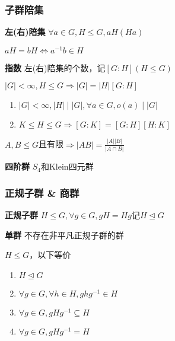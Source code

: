\documentclass[a4paper,10pt]{ctexart}
\newcommand*{\impl}{\Rightarrow}
\renewcommand*{\iff}{\Leftrightarrow}
\renewcommand*{\leq}{\leqslant}
\newcommand*{\nmsubgroupeq}{\trianglelefteq}
\begin{document}
\begin{multicols}{3}
    \subsubsection{子群陪集}

    \textbf{左(右)陪集} $\forall a \!\in\! G, H \!\leq\! G, aH(Ha)$

    \begin{theorem}[陪集相等判则]
        $aH = bH \iff a^{-1}b \in H$
    \end{theorem}

    \textbf{指数} 左(右)陪集的个数，记$[G\!:\!H](H \!\leq\! G)$

    \begin{theorem}[Lagrange定理]
        $|G| \! < \! \infty, H \!\leq\! G \!\impl\! |G| \! = \! |H|[G:H]$
    \end{theorem}

    \begin{theorem}[指数性质]
        \hfil

        \begin{enumerate}
            \item $|G| < \infty, |H| \mid |G|, \forall a \in G, o(a) \mid |G|$
            \item $K \!\leq\! H \!\leq\! G \!\impl\! [G\!:\!K] \! = \! [G\!:\!H][H\!:\!K]$
        \end{enumerate}
    \end{theorem}

    \begin{theorem}[子群阶]
        $A, B \!\leq\! G$且有限$\impl |AB| = \frac{ |A| |B| }{ |A \cap B| }$
    \end{theorem}

    \textbf{四阶群} $S_4$和Klein四元群

    \subsubsection{正规子群 \& 商群}

    \textbf{正规子群} $H \!\!\leq\!\! G, \forall g \!\in\! G, gH \! = \! Hg$记$H \!\nmsubgroupeq\! G$

    \textbf{单群} 不存在非平凡正规子群的群

    \begin{theorem}[正规子群判则]
        $H \leq G$，以下等价
        \begin{enumerate}
            \item $H \nmsubgroupeq G$
            \item $\forall g \in G,\forall h \in H, ghg^{-1} \in H$
            \item $\forall g \in G, gHg^{-1} \subseteq H$
            \item $\forall g \in G, gHg^{-1} = H$
        \end{enumerate}
    \end{theorem}


\end{multicols}
\end{document}
